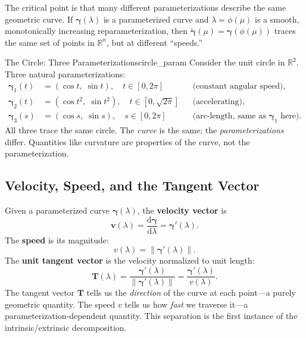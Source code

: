 \documentclass[12pt, openany]{book}
\theoremstyle{plain}
\newcommand{\traj}{\bm{\gamma}}
\newcommand{\Reals}{\mathbb{R}}
\newcommand{\dd}{\mathrm{d}}
\newcommand{\norm}[1]{\left\lVert #1 \right\rVert}
\newcommand{\tangent}{\bm{T}}
\begin{document}
The critical point is that many different parameterizations describe the same
geometric curve. If $\traj(\lambda)$ is a parameterized curve and
$\lambda = \phi(\mu)$ is a smooth, monotonically increasing reparameterization,
then $\tilde{\traj}(\mu) = \traj(\phi(\mu))$ traces the same set of points in
$\Reals^n$, but at different ``speeds.''

\begin{example}{The Circle: Three Parameterizations}{circle_param}
  Consider the unit circle in $\Reals^2$. Three natural parameterizations:
  \begin{align}
    \traj_1(t) &= (\cos t,\; \sin t), \quad t \in [0, 2\pi]
    && \text{(constant angular speed)}, \\
    \traj_2(t) &= (\cos t^2,\; \sin t^2), \quad t \in [0, \sqrt{2\pi}]
    && \text{(accelerating)}, \\
    \traj_3(s) &= (\cos s,\; \sin s), \quad s \in [0, 2\pi]
    && \text{(arc-length, same as $\traj_1$ here)}.
  \end{align}
  All three trace the same circle. The \emph{curve} is the same; the
  \emph{parameterizations} differ. Quantities like curvature are properties of
  the curve, not the parameterization.
\end{example}

\subsection{Velocity, Speed, and the Tangent Vector}

Given a parameterized curve $\traj(\lambda)$, the \textbf{velocity vector} is
\begin{equation}
  \bm{v}(\lambda) = \frac{\dd\traj}{\dd\lambda} = \traj'(\lambda).
\end{equation}
The \textbf{speed} is its magnitude:
\begin{equation}
  v(\lambda) = \norm{\traj'(\lambda)}.
\end{equation}
The \textbf{unit tangent vector} is the velocity normalized to unit length:
\begin{equation}\label{eq:unit_tangent}
  \tangent(\lambda) = \frac{\traj'(\lambda)}{\norm{\traj'(\lambda)}}
  = \frac{\traj'(\lambda)}{v(\lambda)}.
\end{equation}
The tangent vector $\tangent$ tells us the \emph{direction} of the curve at each
point---a purely geometric quantity. The speed $v$ tells us how \emph{fast} we
traverse it---a parameterization-dependent quantity. This separation is the first
instance of the intrinsic/extrinsic decomposition.
\end{document}
